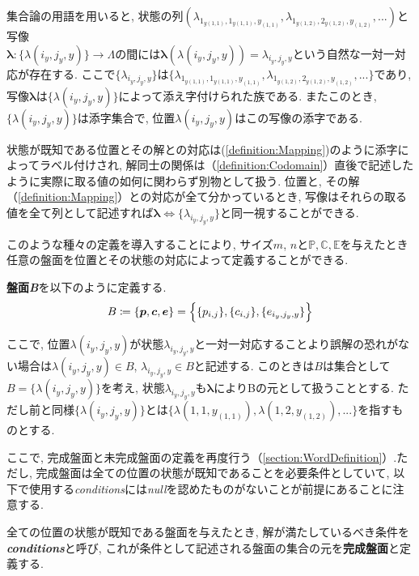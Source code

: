 集合論の用語を用いると, 状態の列$(\lambda_{1_{y(1,1)},1_{y(1,1)},y_{(1,1)}}, \lambda_{1_{y(1,2)},2_{y(1,2)},y_{(1,2)}},...)$と写像\\
$\bm{\lambda}\colon \{\lambda(i_y,j_y,y)\} \longrightarrow \Lambda$の間には$\bm{\lambda}(\lambda(i_y,j_y,y))=\lambda_{i_y,j_y,y}$という自然な一対一対応が存在する.
ここで$\{\lambda_{i_y,j_y,y}\}$は$\{\lambda_{1_{y(1,1)},1_{y(1,1)},y_{(1,1)}}, \lambda_{1_{y(1,2)},2_{y(1,2)},y_{(1,2)}},...\}$であり, 写像$\bm{\lambda}$は$\{\lambda(i_y,j_y,y)\}$によって添え字付けられた族である. またこのとき, $\{\lambda(i_y,j_y,y)\}$は添字集合で, 位置$\lambda(i_y,j_y,y)$はこの写像の添字である.

状態が既知である位置とその解との対応は(\cref{definition:Mapping})のように添字によってラベル付けされ, 解同士の関係は（\cref{definition:Codomain}）直後で記述したように実際に取る値の如何に関わらず別物として扱う.
位置と, その解（\cref{definition:Mapping}）との対応が全て分かっているとき, 写像はそれらの取る値を全て列として記述すれば$\bm{\lambda}\Leftrightarrow \{\lambda_{i_y,j_y,y}\}$と同一視することができる.

このような種々の定義を導入することにより, サイズ$m$, $n$と$\mathbb{P},\mathbb{C},\mathbb{E}$を与えたとき任意の盤面を位置とその状態の対応によって定義することができる.
\begin{definition}[盤面\textit{B}]\label{definition:B}
  \textbf{盤面\textit{B}}を以下のように定義する.
  \begin{equation}
    B\coloneqq \{\bm{p},\bm{c},\bm{e}\}=\Bigl\{\{p_{i,j}\},\{c_{i,j}\},\{e_{i_y,j_y,y}\}\Bigr\}
  \end{equation}
\end{definition}
ここで, 位置$\lambda(i_y,j_y,y)$が状態$\lambda_{i_y,j_y,y}$と一対一対応することより誤解の恐れがない場合は$\lambda(i_y,j_y,y) \in B  $, $\lambda_{i_y,j_y,y}\in B $と記述する.
このときは$B$は集合として$B=\{\lambda(i_y,j_y,y)\}$を考え, 状態$\lambda_{i_y,j_y,y}$も$\bm{\lambda}$によりBの元として扱うこととする.
ただし前と同様$\{\lambda(i_y,j_y,y)\}$とは$\{\lambda(1,1,y_{(1,1)}), \lambda(1,2,y_{(1,2)}),...\}$を指すものとする.



ここで, 完成盤面と未完成盤面の定義を再度行う（\cref{section:WordDefinition}）.ただし, 完成盤面は全ての位置の状態が既知であることを必要条件としていて, 以下で使用する\textit{conditions}には\textit{null}を認めたものがないことが前提にあることに注意する.
\begin{definition}\label{definition:Conditions}
  全ての位置の状態が既知である盤面を与えたとき, 解が満たしているべき条件を\textbf{\textit{conditions}}と呼び, これが条件として記述される盤面の集合の元を\textbf{完成盤面}と定義する.
\end{definition}

